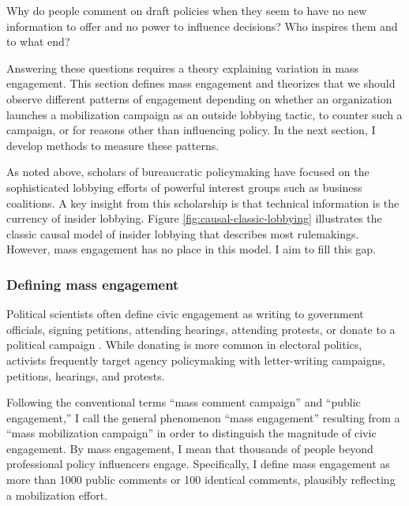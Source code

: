 
Why do people comment on draft policies when they seem to have no new information to offer and no power to influence decisions? Who inspires them and to what end? 

Answering these questions requires a theory explaining variation in mass engagement.  
This section defines mass engagement and theorizes that we should observe different patterns of engagement depending on whether an organization launches a mobilization campaign as an outside lobbying tactic, to counter such a campaign, or for reasons other than influencing policy. In the next section, I develop methods to measure these patterns.

As noted above, scholars of bureaucratic policymaking have focused on the sophisticated lobbying efforts of powerful interest groups such as business coalitions. A key insight from this scholarship is that technical information is the currency of insider lobbying. Figure \ref{fig:causal-classic-lobbying} illustrates the classic causal model of insider lobbying that describes most rulemakings. However, mass engagement has no place in this model. I aim to fill this gap.




\subsubsection{Defining mass engagement}
Political scientists often define civic engagement as writing to government officials, signing petitions, attending hearings, attending protests, or donate to a political campaign \citep{Verba1984}. While donating is more common in electoral politics, activists frequently target agency policymaking with letter-writing campaigns, petitions, hearings, and protests. 

Following the conventional terms ``mass comment campaign'' and ``public engagement,'' I call the general phenomenon ``mass engagement'' resulting from a ``mass mobilization campaign'' in order to distinguish the magnitude of civic engagement.
By mass engagement, I mean that thousands of people beyond professional policy influencers engage. Specifically, I define mass engagement as more than 1000 public comments or 100 identical comments, plausibly reflecting a mobilization effort.  

